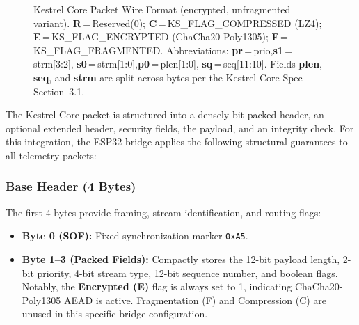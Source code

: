 \documentclass[11pt,a4paper]{article}
\begin{document}
\begin{figure}[H]
{
    }
    \caption{Kestrel Core Packet Wire Format (encrypted, unfragmented variant).
    \textbf{R}\,=\,Reserved(0);\enspace
    \textbf{C}\,=\,KS\_FLAG\_COMPRESSED (LZ4);\enspace
    \textbf{E}\,=\,KS\_FLAG\_ENCRYPTED (ChaCha20-Poly1305);\enspace
    \textbf{F}\,=\,KS\_FLAG\_FRAGMENTED.\enspace
    Abbreviations: \textbf{pr}\,=\,prio,\enspace \textbf{s1}\,=\,strm[3:2],\enspace
    \textbf{s0}\,=\,strm[1:0],\enspace \textbf{p0}\,=\,plen[1:0],\enspace
    \textbf{sq}\,=\,seq[11:10].\enspace
    Fields \textbf{plen}, \textbf{seq}, and \textbf{strm} are split
    across bytes per the Kestrel Core Spec Section~3.1.}
    \label{fig:pktformat}
\end{figure}

The Kestrel Core packet is structured into a densely bit-packed header, an optional extended header, security fields, the payload, and an integrity check. For this integration, the ESP32 bridge applies the following structural guarantees to all telemetry packets:

\subsubsection{Base Header (4 Bytes)}
The first 4 bytes provide framing, stream identification, and routing flags:
\begin{itemize}[noitemsep]
    \item \textbf{Byte 0 (SOF):} Fixed synchronization marker \texttt{0xA5}.
    \item \textbf{Byte 1--3 (Packed Fields):} Compactly stores the 12-bit payload length, 2-bit priority, 4-bit stream type, 12-bit sequence number, and boolean flags. Notably, the \textbf{Encrypted (E)} flag is always set to 1, indicating ChaCha20-Poly1305 AEAD is active. Fragmentation (F) and Compression (C) are unused in this specific bridge configuration.
\end{itemize}
\end{document}

